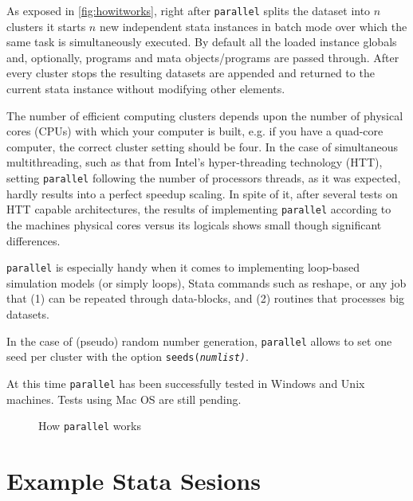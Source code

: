 \documentclass[letterpaper, 14pt, titlepage]{article}
\begin{document}
\begin{landscape}
As exposed in \autoref{fig:howitworks}, right after {\tt parallel} splits the dataset into $n$ clusters it starts $n$ new independent stata instances in batch mode over which the same task is simultaneously executed. By default all the loaded instance globals and, optionally, programs and mata objects/programs are passed through. After every cluster stops the resulting datasets are appended and returned to the current stata instance without modifying other elements.

The number of efficient computing clusters depends upon the number of physical cores (CPUs) with which your computer is built, e.g. if you have a quad-core computer, the correct cluster setting should be four. In the case of simultaneous multithreading, such as that from Intel's hyper-threading technology (HTT), setting {\tt parallel} following the number of processors threads, as it was expected, hardly results into a perfect speedup scaling. In spite of it, after several tests on HTT capable architectures, the results of implementing {\tt parallel} according to the machines physical cores versus its logicals shows small though significant differences.

{\tt parallel} is especially handy when it comes to implementing loop-based simulation models (or simply loops), Stata commands such as reshape, or any job that (1) can be repeated through data-blocks, and (2) routines that processes big datasets.

In the case of (pseudo) random number generation, {\tt parallel} allows to set one seed per cluster with the option {\tt seeds(\it{numlist})}.

At this time {\tt parallel} has been successfully tested in Windows and Unix machines. Tests using Mac OS are still pending.

\clearpage

\begin{figure}[tp]
\centering
\caption{\Large How {\tt parallel} works\label{fig:howitworks}}
\bigskip
\scalebox{1.4}{


}
\end{figure}

\clearpage
\def\win1{Intel Core i5 M560 (dual-core)}
\def\unix1{Intel Xeon X470 (octa-core)}

\pagebreak

\section{\Huge Example Stata Sesions}


\end{landscape}
\end{document}

